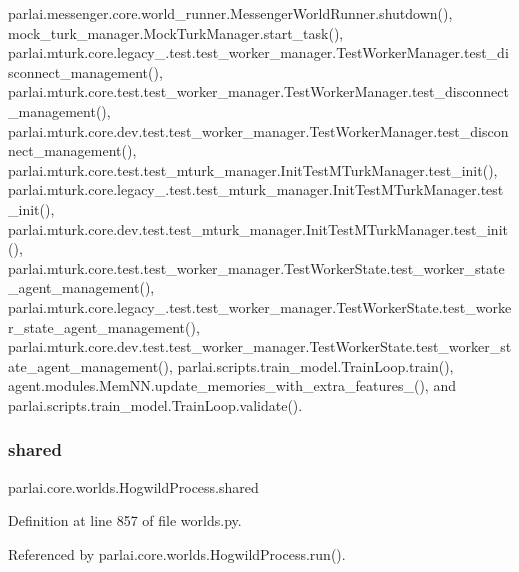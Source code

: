 parlai.\+messenger.\+core.\+world\+\_\+runner.\+Messenger\+World\+Runner.\+shutdown(), mock\+\_\+turk\+\_\+manager.\+Mock\+Turk\+Manager.\+start\+\_\+task(), parlai.\+mturk.\+core.\+legacy\+\_.\+test.\+test\+\_\+worker\+\_\+manager.\+Test\+Worker\+Manager.\+test\+\_\+disconnect\+\_\+management(), parlai.\+mturk.\+core.\+test.\+test\+\_\+worker\+\_\+manager.\+Test\+Worker\+Manager.\+test\+\_\+disconnect\+\_\+management(), parlai.\+mturk.\+core.\+dev.\+test.\+test\+\_\+worker\+\_\+manager.\+Test\+Worker\+Manager.\+test\+\_\+disconnect\+\_\+management(), parlai.\+mturk.\+core.\+test.\+test\+\_\+mturk\+\_\+manager.\+Init\+Test\+M\+Turk\+Manager.\+test\+\_\+init(), parlai.\+mturk.\+core.\+legacy\+\_.\+test.\+test\+\_\+mturk\+\_\+manager.\+Init\+Test\+M\+Turk\+Manager.\+test\+\_\+init(), parlai.\+mturk.\+core.\+dev.\+test.\+test\+\_\+mturk\+\_\+manager.\+Init\+Test\+M\+Turk\+Manager.\+test\+\_\+init(), parlai.\+mturk.\+core.\+test.\+test\+\_\+worker\+\_\+manager.\+Test\+Worker\+State.\+test\+\_\+worker\+\_\+state\+\_\+agent\+\_\+management(), parlai.\+mturk.\+core.\+legacy\+\_.\+test.\+test\+\_\+worker\+\_\+manager.\+Test\+Worker\+State.\+test\+\_\+worker\+\_\+state\+\_\+agent\+\_\+management(), parlai.\+mturk.\+core.\+dev.\+test.\+test\+\_\+worker\+\_\+manager.\+Test\+Worker\+State.\+test\+\_\+worker\+\_\+state\+\_\+agent\+\_\+management(), parlai.\+scripts.\+train\+\_\+model.\+Train\+Loop.\+train(), agent.\+modules.\+Mem\+N\+N.\+update\+\_\+memories\+\_\+with\+\_\+extra\+\_\+features\+\_\+(), and parlai.\+scripts.\+train\+\_\+model.\+Train\+Loop.\+validate().

\mbox{\label{classparlai_1_1core_1_1worlds_1_1HogwildProcess_a614b61613d85c80764b8b68697697e13}} 
\subsubsection{\texorpdfstring{shared}{shared}}
{\footnotesize\ttfamily parlai.\+core.\+worlds.\+Hogwild\+Process.\+shared}



Definition at line 857 of file worlds.\+py.



Referenced by parlai.\+core.\+worlds.\+Hogwild\+Process.\+run().

